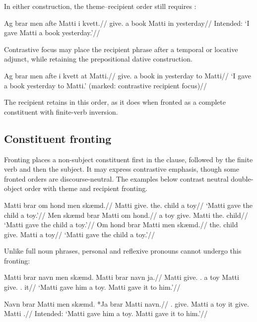 In either construction, the theme--recipient order still requires :

\pex
\begingl
\gla *Ag brar men afte Matti i kvett.//
\glb \First{}\Sg{} give.\Pst{} a book Matti
      in yesterday//
\glft Intended: `I gave Matti a book yesterday.'//
\endgl
\xe

Contrastive focus may place the recipient phrase after a temporal or locative adjunct, while retaining the prepositional dative construction.

\pex
\begingl
\gla Ag brar men afte i kvett at Matti.//
\glb \First{}\Sg{} give.\Pst{} a book
      in yesterday to Matti//
\glft `I gave a book yesterday to Matti.'
      (marked: contrastive recipient focus)//
\endgl
\xe

The recipient retains  in this order, as it does when fronted as a complete constituent with finite-verb inversion.

\subsection{Constituent fronting}
\label{sec:constituent-fronting}

Fronting places a non-subject constituent first in the clause, followed by the finite verb and then the subject. It may express contrastive emphasis, though some fronted orders are discourse-neutral. The examples below contrast neutral double-object order with theme and recipient fronting.

\pex
\begingl
\gla Matti brar om hond men skæmd.//
\glb Matti give.\Pst{} the.\Dat{} child a toy//
\glft `Matti gave the child a toy.'//
\endgl
\xe
\pex
\begingl
\gla Men skæmd brar Matti om hond.//
\glb a toy give.\Pst{} Matti the.\Dat{} child//
\glft `Matti gave the child a toy.'//
\endgl
\xe
\pex
\begingl
\gla Om hond brar Matti men skæmd.//
\glb the.\Dat{} child give.\Pst{} Matti a toy//
\glft `Matti gave the child a toy.'//
\endgl
\xe

Unlike full noun phrases, personal and reflexive pronouns cannot undergo this fronting:

\pex
\begingl
\gla Matti brar navn men skæmd. Matti brar navn ja.//
\glb Matti give.\Pst{} \Third{}\Sg{}.\Dat{} a toy Matti give.\Pst{} \Third{}\Sg{}.\Dat{} it//
\glft `Matti gave him a toy. Matti gave it to him.'//
\endgl
\xe

\pex
\begingl
\gla *Navn brar Matti men skæmd. *Ja brar Matti navn.//
\glb \Third{}\Sg{}.\Dat{} give.\Pst{} Matti a toy it give.\Pst{} Matti \Third{}\Sg{}.\Dat{}//
\glft Intended: `Matti gave him a toy. Matti gave it to him.'//
\endgl
\xe

